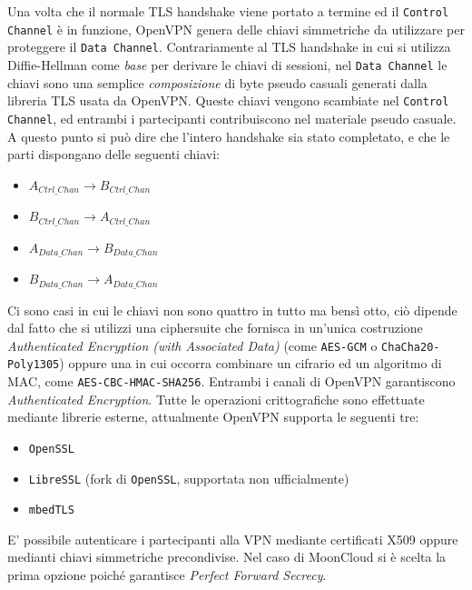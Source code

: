 Una volta che il normale TLS handshake viene portato a termine ed il \texttt{Control Channel}
è in funzione, OpenVPN genera delle chiavi simmetriche da utilizzare per proteggere
il \texttt{Data Channel}. Contrariamente al TLS handshake in cui si utilizza Diffie-Hellman
come \textit{base} per derivare le chiavi di sessioni, nel \texttt{Data Channel} le
chiavi sono una semplice \textit{composizione} di byte pseudo casuali generati
dalla libreria TLS usata da OpenVPN. Queste chiavi
vengono scambiate nel \texttt{Control Channel}, ed entrambi i partecipanti contribuiscono
nel materiale pseudo casuale.\\
A questo punto si può dire che l'intero handshake sia stato completato, e che le parti
dispongano delle seguenti chiavi:
\begin{itemize}
	\item $A_{Ctrl\_Chan} \rightarrow B_{Ctrl\_Chan}$
	\item $B_{Ctrl\_Chan} \rightarrow A_{Ctrl\_Chan}$
	\item $A_{Data\_Chan} \rightarrow B_{Data\_Chan}$
	\item $B_{Data\_Chan} \rightarrow A_{Data\_Chan}$
\end{itemize}
Ci sono casi in cui le chiavi non sono quattro in tutto ma bensì otto, ciò dipende
dal fatto che si utilizzi una ciphersuite che fornisca in un'unica costruzione \textit{Authenticated
	Encryption (with Associated Data)} (come \texttt{AES-GCM} o \texttt{ChaCha20-Poly1305})
	oppure una in cui
occorra combinare un cifrario ed un algoritmo di MAC, come \texttt{AES-CBC-HMAC-SHA256}.
Entrambi i canali di OpenVPN garantiscono \textit{Authenticated Encryption}.
Tutte le operazioni crittografiche sono effettuate mediante librerie esterne,
attualmente OpenVPN supporta le seguenti tre:
\begin{itemize}
	\item \texttt{OpenSSL}
	\item \texttt{LibreSSL} (fork di \texttt{OpenSSL}, supportata non ufficialmente)
	\item \texttt{mbedTLS}
\end{itemize}

E' possibile autenticare i partecipanti alla VPN mediante
certificati X509 oppure medianti chiavi simmetriche precondivise. Nel caso di MoonCloud
si è scelta la prima opzione poiché garantisce \textit{Perfect Forward Secrecy}.



